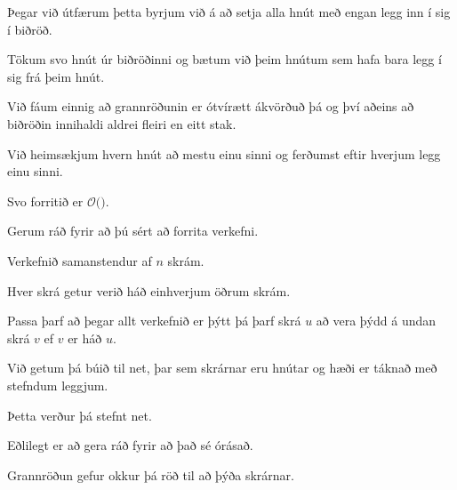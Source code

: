 {
	{
		\item<1-> Þegar við útfærum þetta byrjum við á að setja alla hnút með engan legg inn í sig í biðröð.
		\item<2-> Tökum svo hnút úr biðröðinni og bætum við þeim hnútum sem hafa bara legg í sig frá þeim hnút.
		\item<3-> Við fáum einnig að grannröðunin er ótvírætt ákvörðuð þá og því aðeins að biðröðin innihaldi aldrei fleiri en eitt stak.
	}
}

{
}

{
	{
		\item<1-> Við heimsækjum hvern hnút að mestu einu sinni og ferðumst eftir hverjum legg einu sinni.
		\item<2-> Svo forritið er $\mathcal{O}($\onslide<3->{$E + V$}$)$.
	}
}

{
	{
		\item<1-> Gerum ráð fyrir að þú sért að forrita verkefni.
		\item<2-> Verkefnið samanstendur af $n$ skrám.
		\item<3-> Hver skrá getur verið háð einhverjum öðrum skrám.
		\item<4-> Passa þarf að þegar allt verkefnið er þýtt þá þarf skrá $u$ að vera þýdd á undan skrá $v$ ef $v$ er háð $u$.
		\item<5-> Við getum þá búið til net, þar sem skrárnar eru hnútar og hæði er táknað með stefndum leggjum.
		\item<6-> Þetta verður þá stefnt net.
		\item<7-> Eðlilegt er að gera ráð fyrir að það sé órásað.
		\item<8-> Grannröðun gefur okkur þá röð til að þýða skrárnar.
	}
}

{
}


